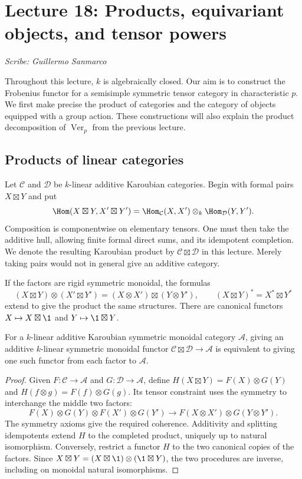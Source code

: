 \section{Lecture 18: Products, equivariant objects, and tensor powers}
\label{lec18}
\noindent\textit{Scribe: Guillermo Sanmarco}

Throughout this lecture, $k$ is algebraically closed. Our aim is to
construct the Frobenius functor for a semisimple symmetric tensor
category in characteristic $p$. We first make precise the product of
categories and the category of objects equipped with a group action.
These constructions will also explain the product decomposition of
$\operatorname{Ver}_p$ from the previous lecture.

\subsection{Products of linear categories}

Let $\mathcal C$ and $\mathcal D$ be $k$-linear additive Karoubian
categories. Begin with formal pairs $X\boxtimes Y$ and put
\[
 \Hom(X\boxtimes Y,X'\boxtimes Y')
 =\Hom_{\mathcal C}(X,X')\otimes_k
   \Hom_{\mathcal D}(Y,Y').
\]
Composition is componentwise on elementary tensors. One must then
take the additive hull, allowing finite formal direct sums, and its
idempotent completion. We denote the resulting Karoubian product by
$\mathcal C\boxtimes\mathcal D$ in this lecture. Merely taking pairs
would not in general give an additive category.

If the factors are rigid symmetric monoidal, the formulas
\[
 (X\boxtimes Y)\otimes(X'\boxtimes Y')
 =(X\otimes X')\boxtimes(Y\otimes Y'),\qquad
 (X\boxtimes Y)^*=X^*\boxtimes Y^*
\]
extend to give the product the same structures. There are canonical
functors $X\mapsto X\boxtimes\1$ and $Y\mapsto\1\boxtimes Y$.

\begin{proposition}
For a $k$-linear additive Karoubian symmetric monoidal category
$\mathcal A$, giving an additive $k$-linear symmetric monoidal functor
$\mathcal C\boxtimes\mathcal D\to\mathcal A$ is equivalent to giving
one such functor from each factor to $\mathcal A$.
\end{proposition}
\begin{proof}
Given $F:\mathcal C\to\mathcal A$ and $G:\mathcal D\to\mathcal A$,
define $H(X\boxtimes Y)=F(X)\otimes G(Y)$ and
$H(f\otimes g)=F(f)\otimes G(g)$. Its tensor constraint uses the
symmetry to interchange the middle two factors:
\[
 F(X)\otimes G(Y)\otimes F(X')\otimes G(Y')
 \longrightarrow F(X\otimes X')\otimes G(Y\otimes Y').
\]
The symmetry axioms give the required coherence. Additivity and
splitting idempotents extend $H$ to the completed product, uniquely
up to natural isomorphism. Conversely, restrict a functor $H$ to the
two canonical copies of the factors. Since
$X\boxtimes Y=(X\boxtimes\1)\otimes(\1\boxtimes Y)$, the two
procedures are inverse, including on monoidal natural isomorphisms.
\end{proof}


